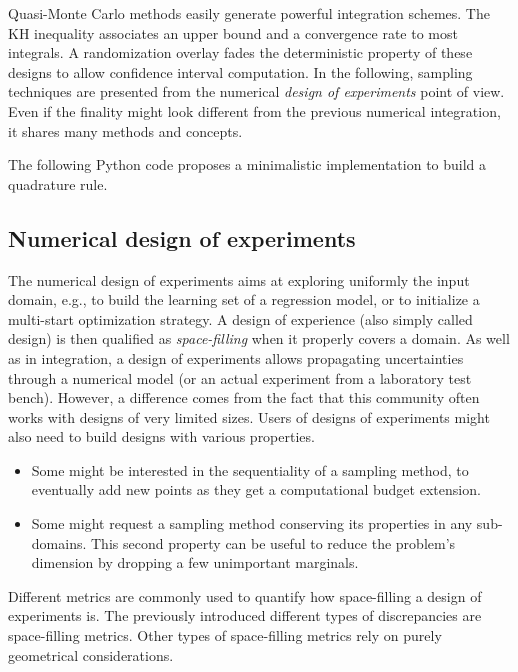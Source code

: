 Quasi-Monte Carlo methods easily generate powerful integration schemes. 
The KH inequality associates an upper bound and a convergence rate to most integrals. 
A randomization overlay fades the deterministic property of these designs to allow confidence interval computation.
In the following, sampling techniques are presented from the numerical \textit{design of experiments} point of view. 
Even if the finality might look different from the previous numerical integration, it shares many methods and concepts. 


\begin{otexample}
    The following Python code proposes a minimalistic \ot implementation to build a quadrature rule. 
\end{otexample}


\subsection{Numerical design of experiments}
The numerical design of experiments aims at exploring uniformly the input domain, e.g., to build the learning set of a regression model, or to initialize a multi-start optimization strategy. 
A design of experience (also simply called design) is then qualified as \textit{space-filling} when it properly covers a domain. 
As well as in integration, a design of experiments allows propagating uncertainties through a numerical model (or an actual experiment from a laboratory test bench). 
However, a difference comes from the fact that this community often works with designs of very limited sizes. 
Users of designs of experiments might also need to build designs with various properties. 
\begin{itemize}
    \item Some might be interested in the sequentiality of a sampling method, to eventually add new points as they get a computational budget extension.
    \item Some might request a sampling method conserving its properties in any sub-domains. 
    This second property can be useful to reduce the problem's dimension by dropping a few unimportant marginals.
\end{itemize}

Different metrics are commonly used to quantify how space-filling a design of experiments is. 
The previously introduced different types of discrepancies are space-filling metrics.
Other types of space-filling metrics rely on purely geometrical considerations.  

